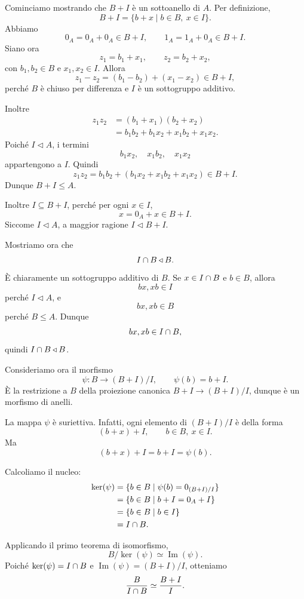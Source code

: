 \documentclass[a4paper]{article}
\begin{document}
\begin{radioactive}
\begin{snippetproof}{}
    Cominciamo mostrando che \(B+I\) è un sottoanello di \(A\).
    Per definizione,
    \[
        B+I=\{b+x\mid b\in B,\ x\in I\}.
    \]
    Abbiamo
    \[
        0_A=0_A+0_A\in B+I,
        \qquad
        1_A=1_A+0_A\in B+I.
    \]
    Siano ora
    \[
        z_1=b_1+x_1,
        \qquad
        z_2=b_2+x_2,
    \]
    con \(b_1,b_2\in B\) e \(x_1,x_2\in I\). Allora
    \[
        z_1-z_2
        =
        (b_1-b_2)+(x_1-x_2)\in B+I,
    \]
    perché \(B\) è chiuso per differenza e \(I\) è un sottogruppo additivo.

    Inoltre
    \begin{align*}
        z_1z_2
        &=
        (b_1+x_1)(b_2+x_2) \\
        &=
        b_1b_2+b_1x_2+x_1b_2+x_1x_2.
    \end{align*}
    Poiché \(I\triangleleft A\), i termini
    \[
        b_1x_2,\quad x_1b_2,\quad x_1x_2
    \]
    appartengono a \(I\). Quindi
    \[
        z_1z_2
        =
        b_1b_2+(b_1x_2+x_1b_2+x_1x_2)\in B+I.
    \]
    Dunque \(B+I\leq A\).

    Inoltre \(I\subseteq B+I\), perché per ogni \(x\in I\),
    \[
        x=0_A+x\in B+I.
    \]
    Siccome \(I\triangleleft A\), a maggior ragione \(I\triangleleft B+I\).

    Mostriamo ora che
    \[
        I\cap B\triangleleft B.
    \]
    È chiaramente un sottogruppo additivo di \(B\). Se \(x\in I\cap B\) e \(b\in B\), allora
    \[
        bx,xb\in I
    \]
    perché \(I\triangleleft A\), e
    \[
        bx,xb\in B
    \]
    perché \(B\leq A\). Dunque
    \[
        bx,xb\in I\cap B,
    \]
    quindi \(I\cap B\triangleleft B\).

    Consideriamo ora il morfismo
    \[
        \psi\colon B\to (B+I)/I,
        \qquad
        \psi(b)=b+I.
    \]
    È la restrizione a \(B\) della proiezione canonica \(B+I\to (B+I)/I\), dunque è un morfismo di anelli.

    La mappa \(\psi\) è suriettiva. Infatti, ogni elemento di \((B+I)/I\) è della forma
    \[
        (b+x)+I,
        \qquad
        b\in B,\ x\in I.
    \]
    Ma
    \[
        (b+x)+I=b+I=\psi(b).
    \]

    Calcoliamo il nucleo:
    \begin{align*}
        \ker(\psi)
        &=
        \{b\in B\mid \psi(b)=0_{(B+I)/I}\} \\
        &=
        \{b\in B\mid b+I=0_A+I\} \\
        &=
        \{b\in B\mid b\in I\} \\
        &=
        I\cap B.
    \end{align*}

    Applicando il primo teorema di isomorfismo,
    \[
        B/\ker(\psi)\simeq \operatorname{Im}(\psi).
    \]
    Poiché \(\ker(\psi)=I\cap B\) e \(\operatorname{Im}(\psi)=(B+I)/I\), otteniamo
    \[
        \frac{B}{I\cap B}
        \simeq
        \frac{B+I}{I}.
    \]
\end{snippetproof}
\end{radioactive}
\end{document}
